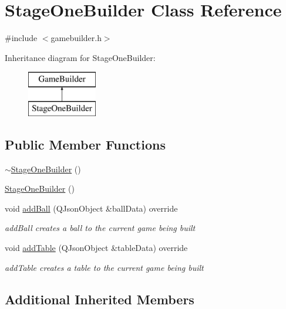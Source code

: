 \hypertarget{class_stage_one_builder}{}\section{Stage\+One\+Builder Class Reference}
\label{class_stage_one_builder}


{\ttfamily \#include $<$gamebuilder.\+h$>$}

Inheritance diagram for Stage\+One\+Builder\+:\begin{figure}[H]
\begin{center}
\leavevmode
\includegraphics[height=2.000000cm]{class_stage_one_builder}
\end{center}
\end{figure}
\subsection*{Public Member Functions}
\begin{DoxyCompactItemize}
\item 
\mbox{\hyperlink{class_stage_one_builder_a1008b1e1d473b4c3e3db2fca1122d4b0}{$\sim$\+Stage\+One\+Builder}} ()
\item 
\mbox{\hyperlink{class_stage_one_builder_aaeaf7f5af709b6530e95db25bab3af13}{Stage\+One\+Builder}} ()
\item 
void \mbox{\hyperlink{class_stage_one_builder_a9d7931aab89afcfa0b2c23da6fb10bfb}{add\+Ball}} (Q\+Json\+Object \&ball\+Data) override
\begin{DoxyCompactList}\small\item\em add\+Ball creates a ball to the current game being built \end{DoxyCompactList}\item 
void \mbox{\hyperlink{class_stage_one_builder_ac8f35ec11ebe31010410bc50b0149ce9}{add\+Table}} (Q\+Json\+Object \&table\+Data) override
\begin{DoxyCompactList}\small\item\em add\+Table creates a table to the current game being built \end{DoxyCompactList}\end{DoxyCompactItemize}
\subsection*{Additional Inherited Members}


